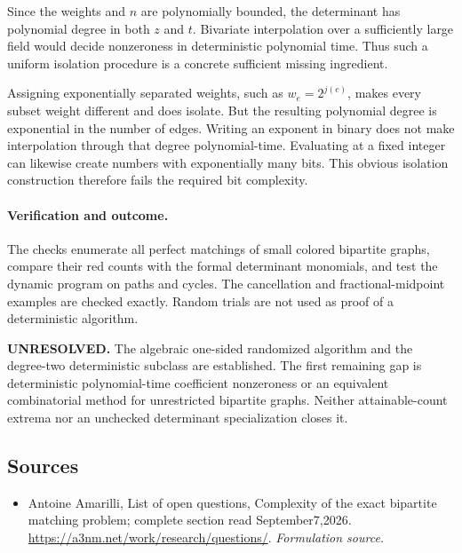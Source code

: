 \documentclass[11pt]{article}
\begin{document}
Since the weights and $n$ are polynomially bounded, the determinant has polynomial degree in both $z$ and $t$. Bivariate interpolation over a sufficiently large field would decide nonzeroness in deterministic polynomial time. Thus such a uniform isolation procedure is a concrete sufficient missing ingredient.

Assigning exponentially separated weights, such as $w_e=2^{j(e)}$, makes every subset weight different and does isolate. But the resulting polynomial degree is exponential in the number of edges. Writing an exponent in binary does not make interpolation through that degree polynomial-time. Evaluating at a fixed integer can likewise create numbers with exponentially many bits. This obvious isolation construction therefore fails the required bit complexity.

\paragraph{Verification and outcome.}
The checks enumerate all perfect matchings of small colored bipartite graphs, compare their red counts with the formal determinant monomials, and test the dynamic program on paths and cycles. The cancellation and fractional-midpoint examples are checked exactly. Random trials are not used as proof of a deterministic algorithm.

\textbf{UNRESOLVED.} The algebraic one-sided randomized algorithm and the degree-two deterministic subclass are established. The first remaining gap is deterministic polynomial-time coefficient nonzeroness or an equivalent combinatorial method for unrestricted bipartite graphs. Neither attainable-count extrema nor an unchecked determinant specialization closes it.

\subsection{Sources}
\begin{itemize}
\item[S1]Antoine Amarilli, List of open questions, Complexity of the exact bipartite matching problem; complete section read September7,2026.
\url{https://a3nm.net/work/research/questions/}.
\textit{Formulation source.}
\end{itemize}
\end{document}

